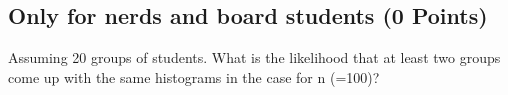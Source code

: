 \documentclass{WeSTassignment}
\begin{document}
\subsection{Only for nerds and board students (0 Points)}
Assuming 20 groups of students. What is the likelihood that at least two groups come up with the same histograms in the case for n (=100)?





\makefooter
\end{document}
